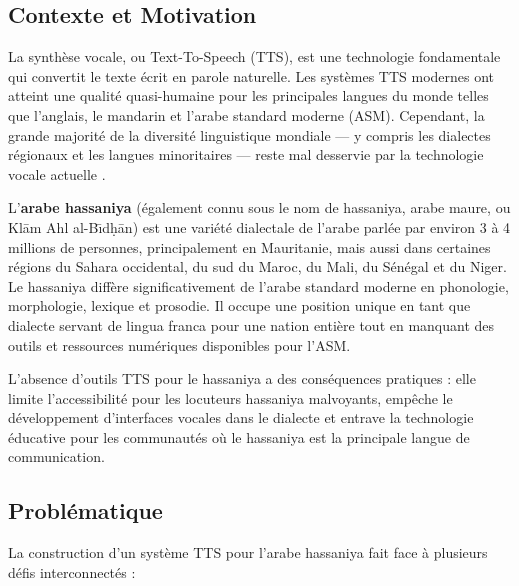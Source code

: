 \documentclass[12pt,a4paper]{article}
\begin{document}
\subsection{Contexte et Motivation}

La synthèse vocale, ou Text-To-Speech (TTS), est une technologie fondamentale qui convertit le texte écrit en parole naturelle. Les systèmes TTS modernes ont atteint une qualité quasi-humaine pour les principales langues du monde telles que l'anglais, le mandarin et l'arabe standard moderne (ASM). Cependant, la grande majorité de la diversité linguistique mondiale --- y compris les dialectes régionaux et les langues minoritaires --- reste mal desservie par la technologie vocale actuelle \citep{xu2020lrspeech}.

L'\textbf{arabe hassaniya} (également connu sous le nom de hassaniya, arabe maure, ou Kl\=am Ahl al-B\={\i}d\d{h}\=an) est une variété dialectale de l'arabe parlée par environ 3 à 4 millions de personnes, principalement en Mauritanie, mais aussi dans certaines régions du Sahara occidental, du sud du Maroc, du Mali, du Sénégal et du Niger. Le hassaniya diffère significativement de l'arabe standard moderne en phonologie, morphologie, lexique et prosodie. Il occupe une position unique en tant que dialecte servant de lingua franca pour une nation entière tout en manquant des outils et ressources numériques disponibles pour l'ASM.

L'absence d'outils TTS pour le hassaniya a des conséquences pratiques : elle limite l'accessibilité pour les locuteurs hassaniya malvoyants, empêche le développement d'interfaces vocales dans le dialecte et entrave la technologie éducative pour les communautés où le hassaniya est la principale langue de communication.

\subsection{Problématique}

La construction d'un système TTS pour l'arabe hassaniya fait face à plusieurs défis interconnectés :
\end{document}
